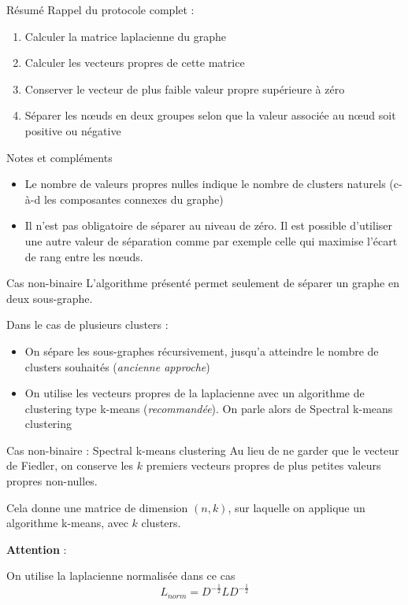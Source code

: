 \begin{frame}{Résumé}
    Rappel du protocole complet :
    \begin{enumerate}
        \item Calculer la matrice laplacienne du graphe
        \item Calculer les vecteurs propres de cette matrice
        \item Conserver le vecteur de plus faible valeur propre supérieure à zéro
        \item Séparer les nœuds en deux groupes selon que la valeur associée au nœud soit positive ou négative
    \end{enumerate}
\end{frame}

\begin{frame}{Notes et compléments}
    \begin{itemize}
        \item Le nombre de valeurs propres nulles indique le nombre de clusters naturels (c-à-d les composantes connexes du graphe)
        \item Il n'est pas obligatoire de séparer au niveau de zéro. Il est possible d'utiliser une autre valeur de séparation comme par exemple celle qui maximise l'écart de rang entre les nœuds.
    \end{itemize}
\end{frame}

\begin{frame}{Cas non-binaire}
    L'algorithme présenté permet seulement de séparer un graphe en deux sous-graphe.

    Dans le cas de plusieurs clusters :
    \begin{itemize}
        \item On sépare les sous-graphes récursivement, jusqu'a atteindre le nombre de clusters souhaités (\textit{ancienne approche})
        \item On utilise les vecteurs propres de la laplacienne avec un algorithme de clustering type k-means (\textit{recommandée}). On parle alors de \alert{Spectral k-means clustering}
    \end{itemize}
\end{frame}

\begin{frame}{Cas non-binaire : Spectral k-means clustering}
    Au lieu de ne garder que le vecteur de Fiedler, on conserve les $k$ premiers vecteurs propres de plus petites valeurs propres non-nulles.

    Cela donne une matrice de dimension $(n,k)$, sur laquelle on applique un algorithme k-means, avec $k$ clusters.

    \alert{\textbf{Attention}} : 
    
    On utilise la laplacienne normalisée dans ce cas 
    $$L_{norm} = D^{-\frac{1}{2}}LD^{-\frac{1}{2}}$$
\end{frame}

